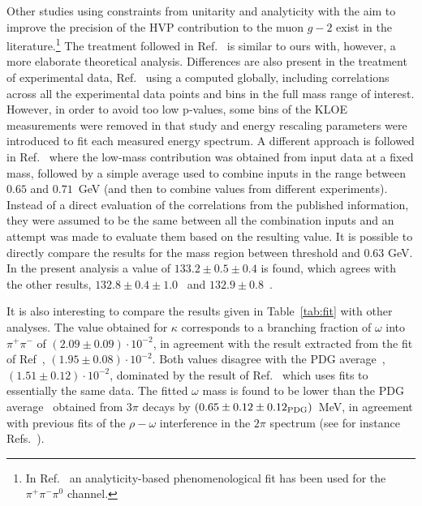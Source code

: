 Other studies using constraints from unitarity and analyticity with the aim to improve the precision of the \pp HVP contribution to the muon $g-2$ exist in the literature.\footnote{In Ref.~\cite{Hoferichter:2019gzf} an analyticity-based phenomenological fit has been used for the $\pi^+\pi^-\pi^0$ channel.}
The treatment followed in Ref.~\cite{Colangelo:2018mtw} is similar to ours with, however, a more elaborate theoretical analysis.
Differences are also present in the treatment of experimental data, Ref.~\cite{Colangelo:2018mtw} using a \chiS computed globally, including correlations across all the experimental data points and bins in the full mass range of interest. However, in order to avoid too low p-values, some bins of the KLOE measurements were removed in that study and energy rescaling parameters were introduced to fit each measured energy spectrum.
A different approach is followed in Ref.~\cite{Ananthanarayan:2018nyx,Ananthanarayan:2019zic} where the low-mass contribution was obtained from input data at a fixed mass, followed by a simple average used to combine inputs in the \sqrtS range between $0.65$ and $0.71$~GeV (and then to combine values from different experiments).
Instead of a direct evaluation of the correlations from the published information, they were assumed to be the same between all the combination inputs and an attempt was made to evaluate them based on the resulting \chiS value.
It is possible to directly compare the results for the mass region between threshold and 0.63 GeV. In the present analysis a value of $133.2 \pm 0.5 \pm 0.4$ is found, which agrees with the other results, $132.8 \pm 0.4 \pm 1.0$~\cite{Colangelo:2018mtw} and $132.9 \pm 0.8$~\cite{Ananthanarayan:2018nyx,Ananthanarayan:2019zic}.

It is also interesting to compare the results given in Table~\ref{tab:fit} with other analyses. The value obtained for $\kappa$ corresponds to a branching fraction of $\omega$ into $\pi^+\pi^-$ of $(2.09\pm0.09)\cdot10^{-2}$, in agreement with the result extracted from the fit of Ref~\cite{Colangelo:2018mtw}, $(1.95\pm0.08)\cdot10^{-2}$. Both values disagree with the PDG average~\cite{pdg}, $(1.51\pm0.12)\cdot10^{-2}$, dominated by the result of Ref.~\cite{Hanhart:2016pcd} which uses fits to essentially the same data. The fitted $\omega$ mass is found to be lower than the PDG average~\cite{pdg} obtained from $3\pi$ decays by $(0.65\pm0.12\pm0.12_{\rm PDG})$~MeV, in agreement with previous fits of the $\rho-\omega$ interference in the $2\pi$ spectrum (see for instance Refs.~\cite{babarpipi2,Colangelo:2018mtw}).

